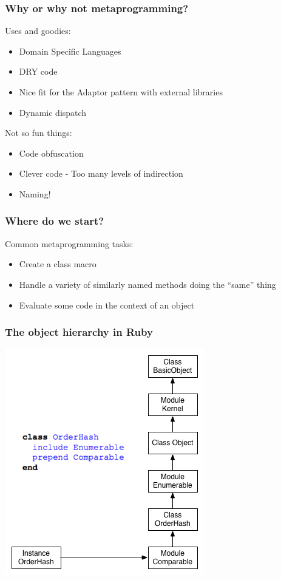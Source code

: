 \begin{frame}\frametitle{Why or why not metaprogramming?}
  Uses and goodies:
  \begin{itemize}
    \item Domain Specific Languages
    \item DRY code
    \item Nice fit for the Adaptor pattern with external libraries
    \item Dynamic dispatch
  \end{itemize}
  Not so fun things:
  \begin{itemize}
    \item Code obfuscation
    \item Clever code - Too many levels of indirection
    \item Naming!
  \end{itemize}

\end{frame}
\begin{frame}\frametitle{Where do we start?}
  Common metaprogramming tasks:
  \begin{itemize}
    \item Create a class macro
    \item Handle a variety of similarly named methods doing the ``same'' thing
    \item Evaluate some code in the context of an object
  \end{itemize}
\end{frame}
\begin{frame}[fragile]\frametitle{The object hierarchy in Ruby}
  \begin{center}
  \includegraphics[scale=.6]{diagrams/object-hierarchy.png}
  \end{center}
\end{frame}

